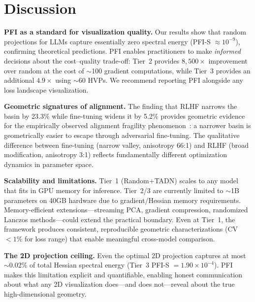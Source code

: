 \documentclass{article}
\begin{document}
\section{Discussion}
\label{sec:discussion}

\textbf{PFI as a standard for visualization quality.} Our results show that random projections for LLMs capture essentially zero spectral energy (PFI-S $\approx 10^{-9}$), confirming theoretical predictions. PFI enables practitioners to make \emph{informed} decisions about the cost--quality trade-off: Tier~2 provides $8{,}500\times$ improvement over random at the cost of $\sim$100 gradient computations, while Tier~3 provides an additional $4.9\times$ using $\sim$60 HVPs. We recommend reporting PFI alongside any loss landscape visualization.

\textbf{Geometric signatures of alignment.} The finding that RLHF narrows the basin by 23.3\% while fine-tuning widens it by 5.2\% provides geometric evidence for the empirically observed alignment fragility phenomenon~\citep{chen2025unveiling}: a narrower basin is geometrically easier to escape through adversarial fine-tuning. The qualitative difference between fine-tuning (narrow valley, anisotropy 66:1) and RLHF (broad modification, anisotropy 3:1) reflects fundamentally different optimization dynamics in parameter space.

\textbf{Scalability and limitations.} Tier~1 (Random+TADN) scales to any model that fits in GPU memory for inference. Tier~2/3 are currently limited to $\sim$1B parameters on 40GB hardware due to gradient/Hessian memory requirements. Memory-efficient extensions---streaming PCA, gradient compression, randomized Lanczos methods---could extend the practical boundary. Even at Tier~1, the framework produces consistent, reproducible geometric characterizations (CV $< 1\%$ for loss range) that enable meaningful cross-model comparison.

\textbf{The 2D projection ceiling.} Even the optimal 2D projection captures at most $\sim$0.02\% of total Hessian spectral energy (Tier~3 PFI-S $= 1.90 \times 10^{-4}$). PFI makes this limitation explicit and quantifiable, enabling honest communication about what any 2D visualization does---and does not---reveal about the true high-dimensional geometry.

\end{document}
